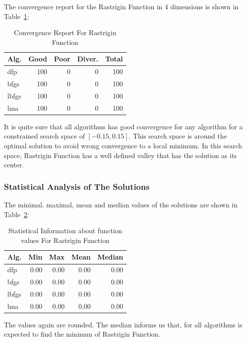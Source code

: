 \documentclass[conference]{IEEEtran}
\begin{document}
The convergence report for the Rastrigin Function in 4 dimensions is shown in Table~\ref{convergence:rastrigin4d}:

\begin{table}[H]
\centering
\caption{Convergence Report For Rastrigin Function}
\label{convergence:rastrigin4d}
\begin{tabular}{lrrrr}
\toprule
 Alg. &  Good &  Poor &  Diver. &  Total \\
\midrule
  dfp &   100 &     0 &       0 &    100 \\
 bfgs &   100 &     0 &       0 &    100 \\
lbfgs &   100 &     0 &       0 &    100 \\
  lma &   100 &     0 &       0 &    100 \\
\bottomrule
\end{tabular}
\end{table}

It is quite sure that all algorithms has good convergence for any algorithm for a
constrained search space of $\left[-0.15, 0.15\right]$. This search space is around
the optimal solution to avoid wrong convergence to a local minimum. In this search space,
Rastrigin Function has a well defined valley that has the solution as its center.
\subsubsection{Statistical Analysis of The Solutions}
\label{statisticalanalysisrastrigin4d4D}


The minimal. maximal, mean and median values of the solutions are shown in Table~\ref{function_values:rastrigin4d}:

\begin{table}[H]
\centering
\caption{Statistical Information about function values For Rastrigin Function}
\label{function_values:rastrigin4d}
\begin{tabular}{lrrrr}
\toprule
 Alg. &  Min &  Max &  Mean &  Median \\
\midrule
  dfp & 0.00 & 0.00 &  0.00 &    0.00 \\
 bfgs & 0.00 & 0.00 &  0.00 &    0.00 \\
lbfgs & 0.00 & 0.00 &  0.00 &    0.00 \\
  lma & 0.00 & 0.00 &  0.00 &    0.00 \\
\bottomrule
\end{tabular}
\end{table}

The values again are rounded. The median informs us that, for all
algorithms is expected to find the minimun of Rastrigin Function.
\end{document}
